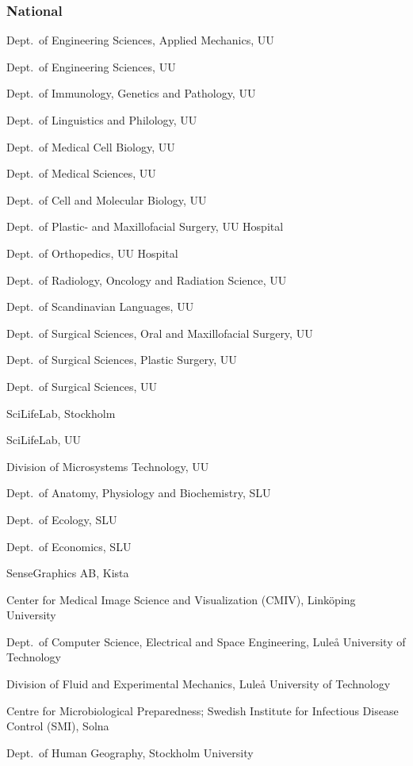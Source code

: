 \subsubsection*{National}
{\small
\begin{trivlist}
\item Dept.~of Engineering Sciences, Applied Mechanics, UU
\item Dept.~of Engineering Sciences, UU
\item Dept.~of Immunology, Genetics and Pathology, UU
\item Dept.~of Linguistics and Philology, UU
\item Dept.~of Medical Cell Biology, UU
\item Dept.~of Medical Sciences, UU
\item Dept.~of Cell and Molecular Biology, UU
\item Dept.~of Plastic- and Maxillofacial Surgery, UU Hospital
\item Dept.~of Orthopedics, UU Hospital
\item Dept.~of Radiology, Oncology and Radiation Science, UU
\item Dept.~of Scandinavian Languages, UU
\item Dept.~of Surgical Sciences, Oral and Maxillofacial Surgery, UU
\item Dept.~of Surgical Sciences, Plastic Surgery, UU
\item Dept.~of Surgical Sciences, UU
\item SciLifeLab, Stockholm
\item SciLifeLab, UU
\item Division of Microsystems Technology, UU
\item Dept.~of Anatomy, Physiology and Biochemistry, SLU
\item Dept.~of Ecology, SLU
\item Dept.~of Economics, SLU
\item SenseGraphics AB, Kista
\item Center for Medical Image Science and Visualization (CMIV), Link\"{o}ping University
\item Dept.~of Computer Science, Electrical and Space Engineering, Lule\r{a} University of Technology
\item Division of Fluid and Experimental Mechanics, Lule\r{a} University of Technology 
\item Centre for Microbiological Preparedness; Swedish Institute for Infectious Disease Control (SMI), Solna
\item Dept.~of Human Geography, Stockholm University

\end{trivlist}}
